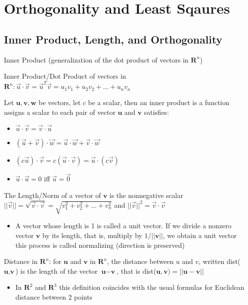 \documentclass[../linalg.tex]{subfiles}
\begin{document}
\chapter{Orthogonality and Least Sqaures}
\section{Inner Product, Length, and Orthogonality}
Inner Product (generalization of the dot product of vectors in $\textbf{R}^n$)

Inner Product/Dot Product of vectors in $\textbf{R}^n: \vec{u}\cdot \vec{v}=\vec{u}^T \vec{v}=u_1v_1+u_2v_2+\dots+u_nv_n$

\begin{theorem}
    Let $\textbf{u},\textbf{v},\textbf{w}$ be vectors, let $c$ be a scalar, then an inner product is a function assigns a scalar to each pair of vector $\textbf{u}$ and $\textbf{v}$ satisfies:
    \begin{itemize}
        \item $\vec{u}\cdot\vec{v}=\vec{v}\cdot\vec{u}$
        \item $(\vec{u}+\vec{v})\cdot\vec{w}=\vec{u}\cdot \vec{w}+\vec{v}\cdot\vec{w}$
        \item $(c\vec{u})\cdot \vec{v}=c(\vec{u}\cdot \vec{v})=\vec{u}\cdot(c\vec{v})$
        \item $\vec{u}\cdot \vec{u} = 0$ iff $\vec{u}=\vec{0}$
    \end{itemize}
\end{theorem}

The Length/Norm of a vector of $\textbf{v}$ is the nonnegative scalar $||\vec{v}||=\sqrt{\vec{v}\cdot\vec{v}}=\sqrt{v_1^2+v_2^2+\dots +v_n^2}$ and $||\vec{v}||^2=\vec{v}\cdot \vec{v}$
\begin{itemize}
    \item A vector whose length is 1 is called a unit vector. If we divide a nonzero vector $\textbf{v}$ by its length, that is, multiply by $1/||\textbf{v}||$, we obtain a unit vector this process is called normalizing (direction is preserved)
\end{itemize}

Distance in $\textbf{R}^n$: for $\textbf{u}$ and $\textbf{v}$ in $\textbf{R}^n$, the distance between $u$ and $v$, written dist($\textbf{u},\textbf{v}$) is the length of the vector $\textbf{u}-\textbf{v}$, that is 
dist($\textbf{u},\textbf{v})=||\textbf{u}-\textbf{v}||$
\begin{itemize}
    \item In $\textbf{R}^2$ and $\textbf{R}^3$ this definition coincides with the usual formulas for Euclidean distance between 2 points 
\end{itemize}
\end{document}
